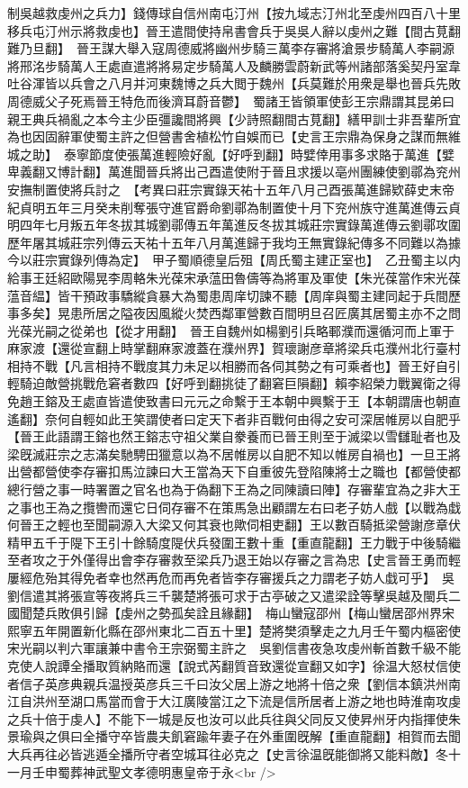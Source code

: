 制吳越救虔州之兵力】錢傳球自信州南屯汀州【按九域志汀州北至虔州四百八十里移兵屯汀州示將救虔也】晉王遣間使持帛書會兵于吳吳人辭以虔州之難【間古莧翻難乃旦翻】　晉王謀大舉入寇周德威將幽州步騎三萬李存審將滄景步騎萬人李嗣源將邢洺步騎萬人王處直遣將將易定步騎萬人及麟勝雲蔚新武等州諸部落奚契丹室韋吐谷渾皆以兵會之八月并河東魏博之兵大閲于魏州【兵莫難於用衆是舉也晉兵先敗周德威父子死焉晉王特危而後濟耳蔚音鬱】　蜀諸王皆領軍使彭王宗鼎謂其昆弟曰親王典兵禍亂之本今主少臣彊讒間將興【少詩照翻間古莧翻】繕甲訓士非吾輩所宜為也因固辭軍使蜀主許之但營書舍植松竹自娛而已【史言王宗鼎為保身之謀而無維城之助】　泰寧節度使張萬進輕險好亂【好呼到翻】時嬖倖用事多求賂于萬進【嬖卑義翻又博計翻】萬進聞晉兵將出己酉遣使附于晉且求援以亳州團練使劉鄩為兖州安撫制置使將兵討之　【考異曰莊宗實錄天祐十五年八月己酉張萬進歸欵薛史末帝紀貞明五年三月癸未削奪張守進官爵命劉鄩為制置使十月下兖州族守進萬進傳云貞明四年七月叛五年冬拔其城劉鄩傳五年萬進反冬拔其城莊宗實錄萬進傳云劉鄩攻圍歷年屠其城莊宗列傳云天祐十五年八月萬進歸于我均王無實錄紀傳多不同難以為據今以莊宗實錄列傳為定】　甲子蜀順德皇后殂【周氏蜀主建正室也】　乙丑蜀主以内給事王廷紹歐陽晃李周輅朱光葆宋承蕰田魯儔等為將軍及軍使【朱光葆當作宋光葆蕰音緼】皆干預政事驕縱貪暴大為蜀患周庠切諫不聽【周庠與蜀主建同起于兵間歷事多矣】晃患所居之隘夜因風縱火焚西鄰軍營數百間明旦召匠廣其居蜀主亦不之問光葆光嗣之從弟也【從才用翻】　晉王自魏州如楊劉引兵略鄆濮而還循河而上軍于麻家渡【還從宣翻上時掌翻麻家渡蓋在濮州界】賀瓌謝彦章將梁兵屯濮州北行臺村相持不戰【凡言相持不戰度其力未足以相勝而各伺其勢之有可乘者也】晉王好自引輕騎迫敵營挑戰危窘者數四【好呼到翻挑徒了翻窘巨隕翻】賴李紹榮力戰翼衛之得免趙王鎔及王處直皆遣使致書曰元元之命繫于王本朝中興繫于王【本朝謂唐也朝直遙翻】奈何自輕如此王笑謂使者曰定天下者非百戰何由得之安可深居帷房以自肥乎【晉王此語謂王鎔也然王鎔志守祖父業自豢養而已晉王則至于滅梁以雪讎耻者也及梁旣滅莊宗之志滿矣馳騁田獵意以為不居帷房以自肥不知以帷房自禍也】一旦王將出營都營使李存審扣馬泣諫曰大王當為天下自重彼先登陷陳將士之職也【都營使都總行營之事一時署置之官名也為于偽翻下王為之同陳讀曰陣】存審輩宜為之非大王之事也王為之攬轡而還它日伺存審不在策馬急出顧謂左右曰老子妨人戲【以戰為戱何晉王之輕也至聞嗣源入大梁又何其衰也歟伺相吏翻】王以數百騎抵梁營謝彦章伏精甲五千于隄下王引十餘騎度隄伏兵發圍王數十重【重直龍翻】王力戰于中後騎繼至者攻之于外僅得出會李存審救至梁兵乃退王始以存審之言為忠【史言晉王勇而輕屢經危殆其得免者幸也然再危而再免者皆李存審援兵之力謂老子妨人戱可乎】　吳劉信遣其將張宣等夜將兵三千襲楚將張可求于古亭破之又遣梁詮等擊吳越及閩兵二國聞楚兵敗俱引歸【虔州之勢孤矣詮且緣翻】　梅山蠻寇邵州【梅山蠻居邵州界宋熙寧五年開置新化縣在邵州東北二百五十里】楚將樊須擊走之九月壬午蜀内樞密使宋光嗣以判六軍讓兼中書令王宗弼蜀主許之　吳劉信書夜急攻虔州斬首數千級不能克使人說譚全播取質納賂而還【說式芮翻質音致還從宣翻又如字】徐温大怒杖信使者信子英彦典親兵温授英彦兵三千曰汝父居上游之地將十倍之衆【劉信本鎮洪州南江自洪州至湖口馬當而會于大江廣陵當江之下流是信所居者上游之地也時淮南攻虔之兵十倍于虔人】不能下一城是反也汝可以此兵往與父同反又使昇州牙内指揮使朱景瑜與之俱曰全播守卒皆農夫飢窘踰年妻子在外重圍旣解【重直龍翻】相賀而去聞大兵再往必皆逃遁全播所守者空城耳往必克之【史言徐温旣能御將又能料敵】冬十一月壬申蜀葬神武聖文孝德明惠皇帝于永<br />
